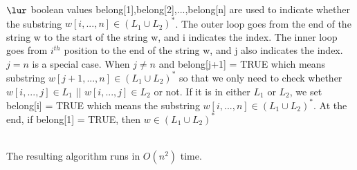 \documentclass[11pt]{article}
\begin{document}
\begin{solution}
$\lur$
boolean values belong[1],belong[2],...,belong[n] are used to indicate whether the substring $w[i,...,n] \in (L_1 \cup L_2)^*$. The outer loop goes from the end of the string w to the start of the string w, and i indicates the index. The inner loop goes from $i^{th}$ position to the end of the string w, and j also indicates the index. $j = n$ is a special case. When $j \neq n$ and belong[j+1] = TRUE which means substring $w[j+1,...,n] \in (L_1 \cup L_2)^*$ so that we only need to check whether $w[i,...,j] \in L_1$ || $w[i,...,j] \in L_2$ or not. If it is in either $L_1$ or $L_2$, we set belong[i] = TRUE which means the substring $w[i,...,n] \in (L_1 \cup L_2)^*$. At the end, if belong[1] = TRUE, then $w \in (L_1 \cup L_2)^*$

\begin{quote}
        \newline
\end{quote} \\
The resulting algorithm runs in $O(n^2)$ time.
\end{solution}
\end{document}

